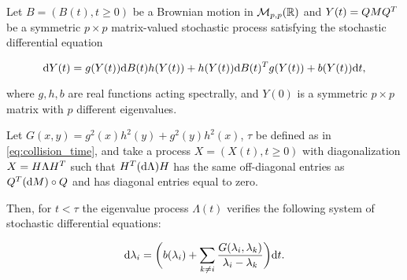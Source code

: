 \begin{theorem} \label{thm:deterministic_diffusion}
    Let $B = (B(t), t\ge 0)$ be a Brownian motion in $\mathcal M_{p,p}(\mathbb R)$ and $Y(t) = QMQ^T$ be a symmetric $p\times p$ matrix-valued stochastic process satisfying the stochastic differential equation

    \begin{equation}
        \mathrm d Y(t) = g(Y(t)) \mathrm d B(t) h(Y(t)) + h(Y(t)) \mathrm d B(t)^T g(Y(t)) + b(Y(t))\mathrm d t, \label{eq:matrix_diffusion}
    \end{equation}

    where $g,h,b$ are real functions acting spectrally, and $Y(0)$ is a symmetric $p\times p$ matrix with $p$ different eigenvalues.

    Let $G(x,y) = g^2(x)h^2(y) + g^2(y)h^2(x)$, $\tau$ be defined as in \eqref{eq:collision_time}, and take a process $X = (X(t), t\ge 0)$ with diagonalization $X = H \Lambda H^T$ such that $H^T (\mathrm d \Lambda) H$ has the same off-diagonal entries as $Q^T ( \mathrm d M) \circ Q$ and has diagonal entries equal to zero.
    
    Then, for $t < \tau$ the eigenvalue process $\Lambda(t)$ verifies the following system of stochastic differential equations:

    \begin{equation}
        \mathrm d \lambda_i = \biggl( b(\lambda_i) + \sum_{k\neq i} \frac{G(\lambda_i,\lambda_k)}{\lambda_i - \lambda_k} \biggr)\mathrm d t.
    \end{equation}
\end{theorem}


